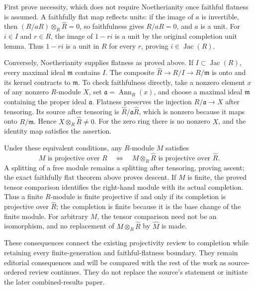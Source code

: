 First prove necessity, which does not require Noetherianity once faithful flatness is assumed. A faithfully flat map reflects units: if the image of \(a\) is invertible, then \((R/aR)\otimes_R\widehat R=0\), so faithfulness gives \(R/aR=0\), and \(a\) is a unit. For \(i\in I\) and \(r\in R\), the image of \(1-ri\) is a unit by the original completion unit lemma. Thus \(1-ri\) is a unit in \(R\) for every \(r\), proving \(i\in\operatorname{Jac}(R)\).

Conversely, Noetherianity supplies flatness as proved above. If \(I\subset\operatorname{Jac}(R)\), every maximal ideal \(\mathfrak m\) contains \(I\). The composite \(\widehat R\to R/I\to R/\mathfrak m\) is onto and its kernel contracts to \(\mathfrak m\). To check faithfulness directly, take a nonzero element \(x\) of any nonzero \(R\)-module \(X\), set \(\mathfrak a=\operatorname{Ann}_R(x)\), and choose a maximal ideal \(\mathfrak m\) containing the proper ideal \(\mathfrak a\). Flatness preserves the injection \(R/\mathfrak a\to X\) after tensoring. Its source after tensoring is \(\widehat R/\mathfrak a\widehat R\), which is nonzero because it maps onto \(R/\mathfrak m\). Hence \(X\otimes_R\widehat R\ne0\). For the zero ring there is no nonzero \(X\), and the identity map satisfies the assertion.

Under these equivalent conditions, any \(R\)-module \(M\) satisfies \[
M\text{ is projective over }R
\quad\Longleftrightarrow\quad
M\otimes_R\widehat R\text{ is projective over }\widehat R .
\] A splitting of a free module remains a splitting after tensoring, proving ascent; the exact faithfully flat theorem above proves descent. If \(M\) is finite, the proved tensor comparison identifies the right-hand module with its actual completion. Thus a finite \(R\)-module is finite projective if and only if its completion is projective over \(\widehat R\); the completion is finite because it is the base change of the finite module. For arbitrary \(M\), the tensor comparison need not be an isomorphism, and no replacement of \(M\otimes_R\widehat R\) by \(\widehat M\) is made.

These consequences connect the existing projectivity review to completion while retaining every finite-generation and faithful-flatness boundary. They remain editorial consequences and will be compared with the rest of the work as source-ordered review continues. They do not replace the source's statement or initiate the later combined-results paper.
